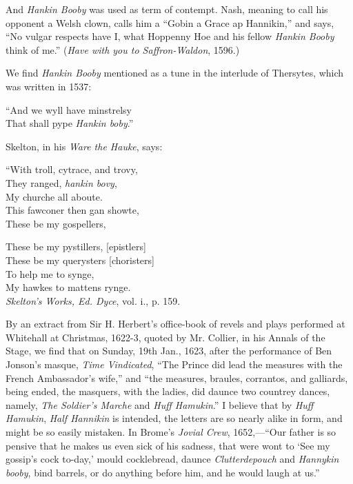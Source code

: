 And \textit{Hankin Booby} was used as term of contempt. Nash, meaning to call his
opponent a Welsh clown, calls him a “Gobin a Grace ap Hannikin,” and says,
“No vulgar respects have I, what Hoppenny Hoe and his fellow \textit{Hankin Booby}
think of me.” (\textit{Have with you to Saffron-Waldon}, 1596.)

We find \textit{Hankin Booby} mentioned as a tune in the interlude of Thersytes,
which was written in 1537:

\settowidth{\versewidth}{“And we wyll have minstrelsy}
\begin{scverse}
“And we wyll have minstrelsy\\
That shall pype \textit{Hankin boby}.”
\end{scverse}

\noindent Skelton, in his \textit{Ware the Hauke}, says:
\settowidth{\versewidth}{“With troll, cytrace, and trovy}
\begin{dcverse}“With troll, cytrace, and trovy,\\
They ranged, \textit{hankin bovy},\\
My churche all aboute.\\
This fawconer then gan showte,\\
These be my gospellers,

These be my pystillers, [epistlers]\\
These be my querysters [choristers]\\
To help me to synge,\\
My hawkes to mattens rynge.\\
\hspace{-1em}\textit{Skelton’s Works, Ed. Dyce}, vol. i., p. 159.
\end{dcverse}

\noindent By an extract from Sir H. Herbert’s office-book of revels and plays performed at
Whitehall at Christmas, 1622-3, quoted by Mr. Collier, in his Annals of the
Stage, we find that on Sunday, 19th Jan., 1623, after the performance of Ben
Jonson’s masque, \textit{Time Vindicated}, “The Prince did lead the measures with the
French Ambassador’s wife,” and “the measures, braules, corrantos, and galliards,
being ended, the masquers, with the ladies, did daunce two countrey dances,
namely, \textit{The Soldier’s Marche} and \textit{Huff Hamukin}.” I believe that by \textit{Huff
Hamukin}, \textit{Half Hannikin} is intended, the letters are so nearly alike in form, and
might be so easily mistaken. In Brome’s \textit{Jovial Crew}, 1652,—“Our father is so
pensive that he makes us even sick of his sadness, that were wont to ‘See my
gossip’s cock to-day,’ mould cocklebread, daunce \textit{Clutterdepouch} and \textit{Hannykin
booby}, bind barrels, or do anything before him, and he would laugh at us.”

